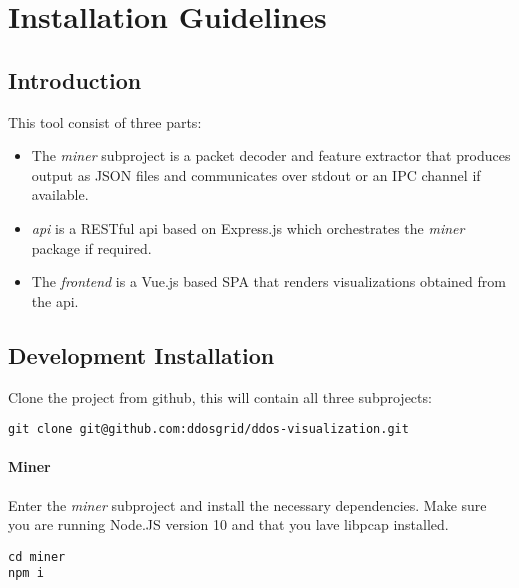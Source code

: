 \appendix

\chapter{Installation Guidelines}

\section{Introduction}

This tool consist of three parts:

\begin{itemize}
    \item The \textit{miner} subproject is a packet decoder and feature extractor that produces output as JSON files and communicates over stdout or an IPC channel if available.
    \item \textit{api} is a RESTful api based on Express.js which orchestrates the \textit{miner} package if required.
    \item The \textit{frontend} is a Vue.js based SPA that renders visualizations obtained from the api.
\end{itemize}{}

\section{Development Installation}
Clone the project from github, this will contain all three subprojects:
\begin{lstlisting}[caption={},label={lst:formattinganalysis}]
git clone git@github.com:ddosgrid/ddos-visualization.git
\end{lstlisting}

\subsubsection{Miner}
Enter the \textit{miner} subproject and install the necessary dependencies. Make sure you are running Node.JS version 10 and that you lave libpcap installed.
\begin{lstlisting}[caption={},label={}]
cd miner
npm i
\end{lstlisting}

